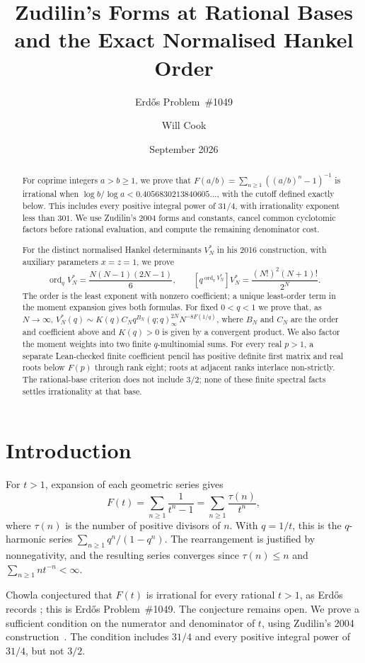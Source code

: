 \documentclass[11pt]{article}
\title{Zudilin's Forms at Rational Bases\\and the Exact Normalised Hankel Order}
\subtitle{Erd\H{o}s Problem~\#1049}
\author{Will Cook}
\date{September 2026}
\begin{document}
\maketitle
\noteprovenance

\begin{abstract}
For coprime integers $a>b\ge1$, we prove that
$F(a/b)=\sum_{n\ge1}((a/b)^n-1)^{-1}$ is irrational when
$\log b/\log a<0.4056830213840605\ldots$, with the cutoff defined
exactly below. This includes every positive integral power of $31/4$,
with irrationality exponent less than $301$. We use Zudilin's 2004
forms and constants, cancel common cyclotomic factors before rational
evaluation, and compute the remaining denominator cost.

For the distinct normalised Hankel determinants $V_N^*$ in his 2016
construction, with auxiliary parameters $x=z=1$, we prove
\[
 \operatorname{ord}_q V_N^*=\frac{N(N-1)(2N-1)}6,
 \qquad [q^{\operatorname{ord}_q V_N^*}]V_N^*
       =\frac{(N!)^2(N+1)!}{2^N}.
\]
The order is the least exponent with nonzero coefficient; a unique
least-order term in the moment expansion gives both formulas.
For fixed $0<q<1$ we prove that, as $N\to\infty$,
$V_N^*(q)\sim K(q)C_Nq^{B_N}(q;q)_\infty^{2N}N^{-8F(1/q)}$, where $B_N$ and
$C_N$ are the order and coefficient above and $K(q)>0$ is given by a
convergent product. We also factor the moment weights into two finite
$q$-multinomial sums. For every real $p>1$, a separate Lean-checked finite
coefficient pencil has positive definite first matrix and real roots below
$F(p)$ through rank eight; roots at adjacent ranks interlace non-strictly.
The rational-base criterion does not include $3/2$; none of these finite
spectral facts settles irrationality at that base.
\end{abstract}

\section{Introduction}\label{sec:problem}

For $t>1$, expansion of each geometric series gives
\[
 F(t)=\sum_{n\ge1}\frac1{t^n-1}
     =\sum_{n\ge1}\frac{\tau(n)}{t^n},
\]
where $\tau(n)$ is the number of positive divisors of $n$.
With $q=1/t$, this is the $q$-harmonic series
$\sum_{n\ge1}q^n/(1-q^n)$.
The rearrangement is justified by nonnegativity, and the resulting series
converges since $\tau(n)\le n$ and $\sum_{n\ge1}nt^{-n}<\infty$.

Chowla conjectured that $F(t)$ is irrational for every rational $t>1$, as
Erd\H{o}s records \cite[p.~102]{erdos1988}; this is Erd\H{o}s
Problem~\#1049. The conjecture remains open. We prove a sufficient condition
on the numerator and denominator of $t$, using Zudilin's 2004
construction~\cite{zudilin2004}. The condition includes $31/4$ and every
positive integral power of $31/4$, but not $3/2$.
\end{document}
